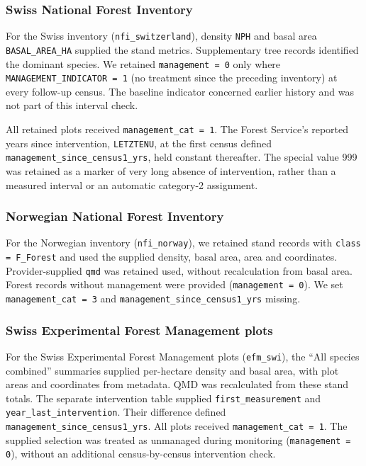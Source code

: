 \documentclass{myreport}
\begin{document}
% 

\subsubsection{Swiss National Forest Inventory}
For the Swiss inventory (\texttt{nfi\_switzerland}), density \texttt{NPH} and basal area \texttt{BASAL\_AREA\_HA} supplied the stand metrics. Supplementary tree records identified the dominant species. We retained \texttt{management = 0} only where \texttt{MANAGEMENT\_INDICATOR = 1} (no treatment since the preceding inventory) at every follow-up census. The baseline indicator concerned earlier history and was not part of this interval check.

All retained plots received \texttt{management\_cat = 1}. The Forest Service's reported years since intervention, \texttt{LETZTENU}, at the first census defined \texttt{management\_since\_census1\_yrs}, held constant thereafter. The special value 999 was retained as a marker of very long absence of intervention, rather than a measured interval or an automatic category-2 assignment.

% 

\subsubsection{Norwegian National Forest Inventory}
For the Norwegian inventory (\texttt{nfi\_norway}), we retained stand records with \texttt{class = F\_Forest} and used the supplied density, basal area, area and coordinates. Provider-supplied \texttt{qmd} was retained used, without recalculation from basal area. Forest records without management were provided (\texttt{management = 0}). We set \texttt{management\_cat = 3} and \texttt{management\_since\_census1\_yrs} missing.

% 

\subsubsection{Swiss Experimental Forest Management plots}
For the Swiss Experimental Forest Management plots (\texttt{efm\_swi}), the ``All species combined'' summaries supplied per-hectare density and basal area, with plot areas and coordinates from metadata. QMD was recalculated from these stand totals. The separate intervention table supplied \texttt{first\_measurement} and \texttt{year\_last\_intervention}. Their difference defined \texttt{management\_since\_census1\_yrs}. All plots received \texttt{management\_cat = 1}. The supplied selection was treated as unmanaged during monitoring (\texttt{management = 0}), without an additional census-by-census intervention check.
\end{document}
